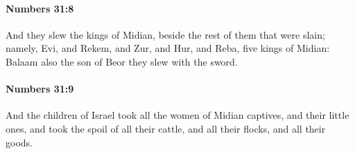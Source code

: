 		\paragraph{Numbers 31:8} %
			\label{NUMBERS-31-8}

			And they slew the kings of Midian, beside the rest of them that were slain; namely, Evi, and Rekem, and Zur, and Hur, and Reba, five kings of Midian: Balaam also the son of Beor they slew with the sword.


		\paragraph{Numbers 31:9} %
			\label{NUMBERS-31-9}

			And the children of Israel took all the women of Midian captives, and their little ones, and took the spoil of all their cattle, and all their flocks, and all their goods.

